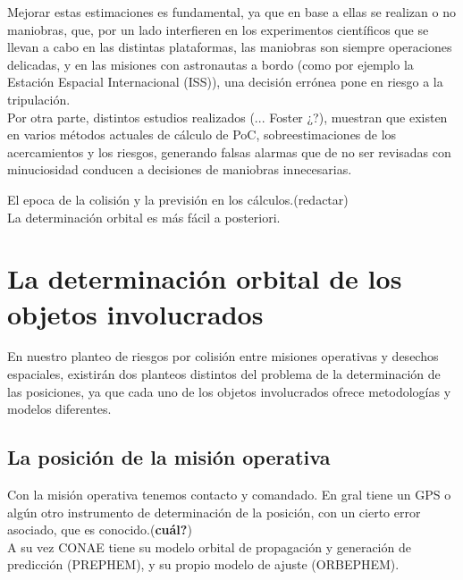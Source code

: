 Mejorar estas estimaciones es fundamental, ya que en base a ellas se realizan o no maniobras, que, por un lado interfieren en los experimentos cient\'ificos que se llevan a cabo en las distintas plataformas, las maniobras son siempre operaciones delicadas, y en las misiones con astronautas a bordo (como por ejemplo la Estaci\'on Espacial Internacional (ISS)), una decisi\'on err\'onea pone en riesgo a la tripulaci\'on.\\

Por otra parte, distintos estudios realizados (... Foster ¿?), muestran que existen en varios m\'etodos actuales de c\'alculo de PoC, sobreestimaciones de los acercamientos y los riesgos, generando falsas alarmas que de no ser revisadas con minuciosidad conducen a decisiones de maniobras innecesarias. 

El epoca de la colisi\'on y la previsi\'on en los c\'alculos.(redactar)\\
La determinaci\'on orbital es m\'as f\'acil a posteriori.\\

\section{La determinaci\'on orbital de los objetos involucrados}

En nuestro planteo de riesgos por colisi\'on entre misiones operativas y desechos espaciales, existir\'an dos planteos distintos del problema de la determinaci\'on de las posiciones, ya que cada uno de los objetos involucrados ofrece metodolog\'ias y modelos diferentes.

\subsection{La posici\'on de la misi\'on operativa}
Con la misi\'on operativa tenemos contacto y comandado. En gral tiene un GPS o alg\'un otro instrumento de determinaci\'on de la posici\'on, con un cierto error asociado, que es conocido.({\bf{cu\'al?}})\\
A su vez CONAE tiene su modelo orbital de propagaci\'on y generaci\'on de predicci\'on (PREPHEM), y su propio modelo de ajuste (ORBEPHEM).\\

